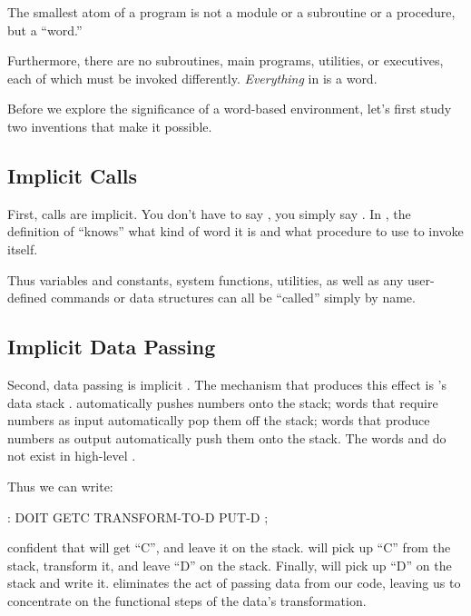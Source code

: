 \begin{tfquot}
The smallest atom of a \Forth{} program is not a module or a subroutine
or a procedure, but a ``word.''
\end{tfquot}
Furthermore, there are no subroutines, main programs, utilities, or
executives, each of which must be invoked differently.
\emph{Everything} in \Forth{} is a word.

Before we explore the significance of a word-based environment, let's
first study two \Forth{} inventions that make it possible.


\subsection{Implicit Calls}%
%
%
First, calls are implicit. You don't have to say ,
you simply say . In \Forth{}, the definition of
 ``knows'' what kind of word it is and what procedure to
use to invoke itself.

Thus variables and constants, system functions, utilities, as well
as any user-defined commands or data structures can all be ``called''
simply by name.%
%
%


\subsection{Implicit Data Passing}%
%
Second, data passing is implicit%
.
The mechanism that produces this effect is \Forth{}'s data stack%
.
\Forth{} automatically pushes numbers onto the stack; words that require
numbers as input automatically pop them off the stack; words that
produce numbers as output automatically push them onto the stack. The
words  and  do not exist in high-level \Forth{}.

Thus we can write:
\begin{Code}
: DOIT
    GETC  TRANSFORM-TO-D  PUT-D ;
\end{Code}
confident that  will get ``C'', and leave it on the stack.
 will pick up ``C'' from the stack, transform
it, and leave ``D'' on the stack. Finally,  will pick up
``D'' on the stack and write it. \Forth{} eliminates the act of passing
data from our code, leaving us to concentrate on the functional steps
of the data's transformation.

